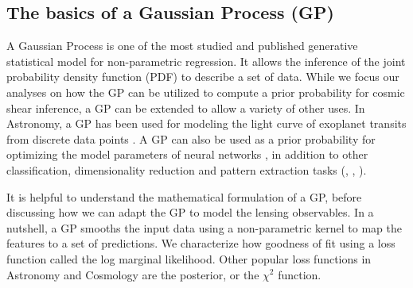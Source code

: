 \subsection{The basics of a Gaussian Process (GP)}
A Gaussian Process is one of the most studied and published 
generative statistical model for non-parametric regression. 
It allows the inference of the joint probability density 
function (PDF) to describe a set of data. 
While we focus our analyses on how the GP can be utilized to compute a prior
probability for cosmic shear inference, a GP can be extended to 
allow a variety of other uses. In Astronomy, a GP has been used for modeling 
the light curve of exoplanet transits from discrete data points
\citep{Ambikasaran2014a}. A GP can also be used as a prior probability for optimizing the 
model parameters of neural networks \citep{Snoek2012}, in addition to 
other classification, dimensionality reduction 
and pattern extraction tasks
(\citealt{Wilson2013}, \citealt{Duvenaud2013}, \citealt{Rasmussen2006}).
 
It is helpful to understand the mathematical formulation of a GP, 
before discussing how we can adapt the GP to model the lensing observables. 
In a nutshell, a GP smooths the input data using a non-parametric kernel
\citep{Hastie1990} to map the features to a set of predictions. 
We characterize how goodness of fit using a loss function called the log
marginal likelihood. Other popular loss functions in Astronomy and Cosmology 
are the posterior, or the $\chi^2$ function.

